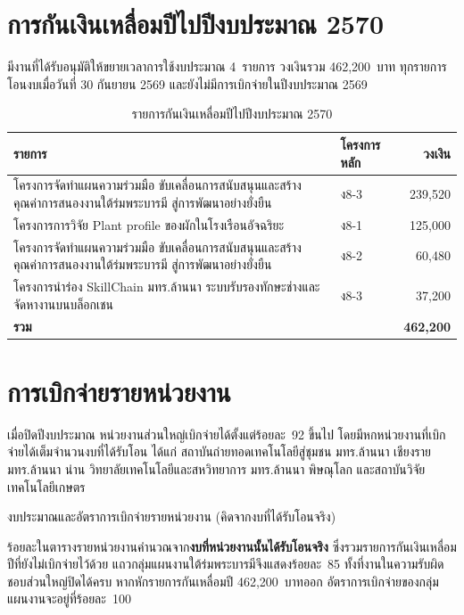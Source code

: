 \section{การกันเงินเหลื่อมปีไปปีงบประมาณ 2570}
มีงานที่ได้รับอนุมัติให้ขยายเวลาการใช้งบประมาณ 4~รายการ วงเงินรวม 462,200~บาท
ทุกรายการโอนงบเมื่อวันที่ 30 กันยายน 2569 และยังไม่มีการเบิกจ่ายในปีงบประมาณ 2569

\begin{table}[H]
\centering
\caption{รายการกันเงินเหลื่อมปีไปปีงบประมาณ 2570}
\small
\begin{tabular}{L{8.6cm}L{1.6cm}r}
\toprule
{}
\textbf{รายการ} & \textbf{โครงการหลัก} & \textbf{วงเงิน}\\
\midrule
โครงการจัดทำแผนความร่วมมือ ขับเคลื่อนการสนับสนุนและสร้างคุณค่าการสนองงานใต้ร่มพระบารมี สู่การพัฒนาอย่างยั่งยืน & ง8-3 & 239,520\\
โครงการการวิจัย Plant profile ของผักในโรงเรือนอัจฉริยะ & ง8-1 & 125,000\\
โครงการจัดทำแผนความร่วมมือ ขับเคลื่อนการสนับสนุนและสร้างคุณค่าการสนองงานใต้ร่มพระบารมี สู่การพัฒนาอย่างยั่งยืน & ง8-2 & 60,480\\
โครงการนำร่อง SkillChain มทร.ล้านนา ระบบรับรองทักษะช่างและจัดหางานบนบล็อกเชน & ง8-3 & 37,200\\
\midrule
{}
\textbf{รวม} & & \textbf{462,200}\\
\bottomrule
\end{tabular}
\end{table}

\section{การเบิกจ่ายรายหน่วยงาน}
เมื่อปิดปีงบประมาณ หน่วยงานส่วนใหญ่เบิกจ่ายได้ตั้งแต่ร้อยละ~92 ขึ้นไป
โดยมีหกหน่วยงานที่เบิกจ่ายได้เต็มจำนวนงบที่ได้รับโอน ได้แก่ สถาบันถ่ายทอดเทคโนโลยีสู่ชุมชน
มทร.ล้านนา เชียงราย มทร.ล้านนา น่าน วิทยาลัยเทคโนโลยีและสหวิทยาการ มทร.ล้านนา พิษณุโลก
และสถาบันวิจัยเทคโนโลยีเกษตร

\begin{table}[H]
\centering
\caption{งบประมาณและอัตราการเบิกจ่ายรายหน่วยงาน (คิดจากงบที่ได้รับโอนจริง)}

\end{table}

\begin{infobox}
ร้อยละในตารางรายหน่วยงานคำนวณจาก\textbf{งบที่หน่วยงานนั้นได้รับโอนจริง}
ซึ่งรวมรายการกันเงินเหลื่อมปีที่ยังไม่เบิกจ่ายไว้ด้วย
แถวกลุ่มแผนงานใต้ร่มพระบารมีจึงแสดงร้อยละ~85 ทั้งที่งานในความรับผิดชอบส่วนใหญ่ปิดได้ครบ
หากหักรายการกันเหลื่อมปี 462,200~บาทออก อัตราการเบิกจ่ายของกลุ่มแผนงานจะอยู่ที่ร้อยละ~100
\end{infobox}


